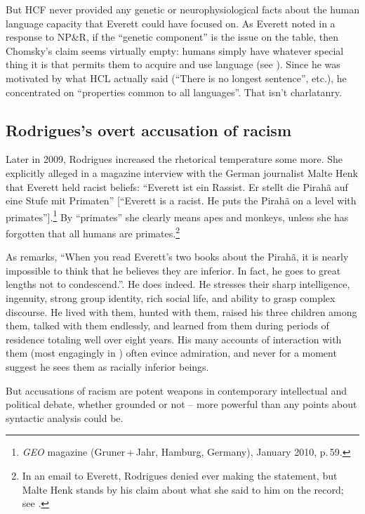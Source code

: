 \documentclass[output=paper,colorlinks,citecolor=brown
]{langscibook}
\begin{document}
But HCF never provided any genetic or neurophysiological facts about the
human language capacity that Everett could have focused on. As Everett
noted in a response to NP\&R, if the ``genetic component'' is the issue
on the table, then Chomsky's claim seems virtually empty: humans simply
have whatever special thing it is that permits them to acquire and use
language (see \citealt[439]{Everett09}). Since he was motivated by what
HCL actually said (``There is no longest sentence'', etc.), he concentrated
on ``properties common to all languages''. That isn't charlatanry.

\subsection{Rodrigues's overt accusation of racism}

Later in 2009, Rodrigues increased the rhetorical temperature some
more. She explicitly alleged in a magazine interview with the German
journalist Malte Henk that Everett held racist beliefs: ``Everett ist
ein Rassist.  Er stellt die Pirah{\~a} auf eine Stufe mit Primaten''
[``Everett is a racist.  He puts the Pirah{\~a} on a level with
primates''].\footnote{
   \textit{GEO} magazine (Gruner\,+\,Jahr, Hamburg, Germany),
   January 2010, p.\,59.}
By ``primates'' she clearly means apes and monkeys, unless she has
forgotten that all humans are primates.\footnote{\label{denial}
   In an email to Everett, Rodrigues denied ever making the statement,
   but Malte Henk stands by his claim about what she said to him on the
   record; see \citet[13]{Everett13}.}

As \citet{Bartlett12} remarks, ``When you read Everett’s two books about
the Pirah{\~a}, it is nearly impossible to think that he believes they
are inferior. In fact, he goes to great lengths not to condescend.''.
He does indeed.  He stresses their sharp intelligence, ingenuity, strong
group identity, rich social life, and ability to grasp complex discourse.
He lived with them, hunted with them, raised his three children among
them, talked with them endlessly, and learned from them during periods
of residence totaling well over eight years. His many accounts of
interaction with them (most engagingly in \citealt{Everett08}) often
evince admiration, and never for a moment suggest he sees them as
racially inferior beings.

But accusations of racism are potent weapons in contemporary
intellectual and political debate, whether grounded or not --
more powerful than any points about syntactic analysis could be.
\end{document}
